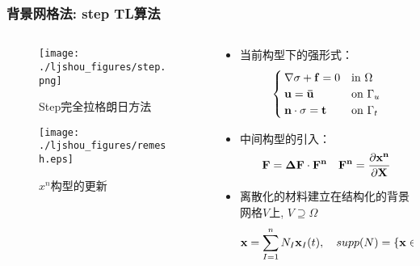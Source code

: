 \documentclass[mathserif]{beamer}
\begin{document}
\begin{CJK}{UTF8}{gkai}
	\begin{frame}
		\frametitle{背景网格法: step TL算法}
		\begin{columns}
    			\begin{column}[pos]{0.4\textwidth}
    				\begin{figure}
    					\centering
    					\texttt{[image: ./ljshou\_figures/step.png]}
    					\label{fig:1}
    					\caption{Step完全拉格朗日方法}
    			    \end{figure}
    			    \begin{figure}
    					\centering
    					\texttt{[image: ./ljshou\_figures/remesh.eps]}
    					\label{fig:2}
    					\caption{$x^n$构型的更新}
    			    \end{figure}
    			\end{column}
    			
    			\begin{column}[pos]{0.6\textwidth}
    			    \footnotesize
    			    \begin{itemize}
    			    \item 当前构型下的强形式：
            			\begin{equation*}
            				\begin{cases}
            					\nabla {\bf \sigma} + {\bf f} = 0& \text{in }\Omega\\
            					{\bf u=\bar{u}}& \text{on }\Gamma_u\\
            					{\bf n}\cdot{\bf \sigma} = {\bf t}& \text{on }\Gamma_t
            				\end{cases}
            			\end{equation*}
            		\item 中间构型的引入：
            		    \begin{equation*}
            		        \bf{F=\Delta F \cdot{F^n} \quad  F^n=\frac{\partial{x^n}}{\partial{X}}}
            		    \end{equation*}
            		\item 离散化的材料建立在结构化的背景网格$V$上, $V \supseteq \Omega$
            			\begin{equation*}
            				{\bf x} = \sum_{I=1}^{n}N_I{\bf x}_I(t), \quad supp(N) = \{{\bf x} \in V \supseteq \Omega\}
            			\end{equation*}
    			    \end{itemize}
            			

\end{column}
\end{columns}
\end{frame}
\end{CJK}
\end{document}
